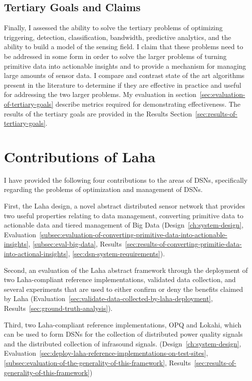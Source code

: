 \subsection{Tertiary Goals and Claims}\label{subsec:tertiary-goals-and-claims}
Finally, I assessed the ability to solve the tertiary problems of optimizing triggering, detection, classification, bandwidth, predictive analytics, and the ability to build a model of the sensing field. I claim that these problems need to be addressed in some form in order to solve the larger problems of turning primitive data into actionable insights and to provide a mechanism for managing large amounts of sensor data. I compare and contrast state of the art algorithms present in the literature to determine if they are effective in practice and useful for addressing the two larger problems. My evaluation in section~\ref{sec:evaluation-of-tertiary-goals} describe metrics required for demonstrating effectiveness. The results of the tertiary goals are provided in the Results Section~\ref{sec:results-of-tertiary-goals}.

\section{Contributions of Laha}\label{subsec:anticipated-contributions}
I have provided the following four contributions to the areas of DSNs, specifically regarding the problems of optimization and management of DSNs.

First, the Laha design, a novel abstract distributed sensor network that provides two useful properties relating to data management, converting primitive data to actionable data and tiered management of Big Data (Design~\ref{ch:system-design}, Evaluation~\ref{subsec:evaluation-of-converting-primitive-data-into-actionable-insights}, \ref{subsec:eval-big-data}, Results~\ref{sec:results-of-converting-primitie-data-into-actional-insights}, \ref{sec:dsn-system-requirements}).

Second, an evaluation of the Laha abstract framework through the deployment of two Laha-compliant reference implementations, validated data collection, and several experiments that are used to either confirm or deny the benefits claimed by Laha (Evaluation~\ref{sec:validate-data-collected-by-laha-deployment}, Results~\ref{sec:ground-truth-analysis}).

Third, two Laha-compliant reference implementations, OPQ and Lokahi, which can be used to form DSNs for the collection of distributed power quality signals and the distributed collection of infrasound signals. (Design~\ref{ch:system-design}, Evaluation~\ref{sec:deploy-laha-reference-implementations-on-test-sites}, \ref{subsec:evaluation-of-the-generality-of-this-framework}, Results~\ref{sec:results-of-generality-of-this-framework})

